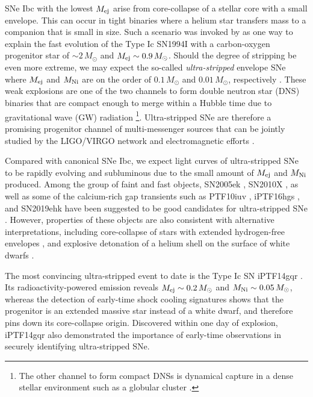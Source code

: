 \documentclass[twocolumn]{aastex63}
\begin{document}
SNe Ibc with the lowest $M_{\rm ej}$ arise from core-collapse of a stellar core with a small envelope. 
This can occur in tight binaries where a helium star transfers 
mass to a companion that is small in size. Such a scenario was invoked by \citet{Nomoto1994} as one
way to explain the fast evolution of the Type Ic SN1994I with a carbon-oxygen progenitor star of $\sim 
2\,M_\odot$ and $M_{\rm ej }\sim 0.9\, M_\odot$. Should the degree of stripping be even more extreme, 
we may expect the so-called \textit{ultra-stripped} envelope SNe where $M_{\rm ej}$ and $M_{\rm Ni} $ 
are on the order of $0.1 \, M_\odot$ and $0.01 \, M_\odot$, respectively \citep{Tauris2013,Tauris2015, 
Suwa2015}. These weak explosions are one of the two channels to form double neutron 
star (DNS) binaries that are compact enough to merge within a Hubble 
time due to gravitational wave (GW) radiation \citep{Beniamini2016, Tauris2017}\footnote{The other 
channel to 	form compact DNSs is dynamical capture in a dense stellar environment such as a globular 
cluster \citep{East2012, Andrews2019}.}. Ultra-stripped SNe are therefore 
a promising progenitor channel of multi-messenger sources that can be  jointly studied 
by the LIGO/VIRGO network and electromagnetic efforts \citep{GW170817, MMA, Goldstein2017, 
Coulter17, Hallinan17, Kasliwal2017}.

Compared with canonical SNe Ibc, we expect light curves of ultra-stripped SNe to be rapidly evolving 
and subluminous due to the small amount of $M_{\rm ej}$ and $M_{\rm Ni}$ produced. Among the 
group of faint and fast objects, SN2005ek \citep{Drout2013}, SN2010X \citep{Kasliwal2010}, as well as 
some of the calcium-rich gap transients such as PTF10iuv \citep{Kasliwal2012}, iPTF16hgs 
\citep{DeKC2018}, and SN2019ehk \citep{Nakaoka2020, Jacobson-Galan2020} have been suggested to 
be good candidates 
for ultra-stripped SNe \citep{Moriya2017}. However, properties of these objects are also consistent 
with alternative interpretations, including core-collapse of stars with extended hydrogen-free envelopes
\citep{Kleiser2014, KleiserFuller2018, KleiserKasen2018}, and explosive detonation of a helium shell on 
the surface of white dwarfs \citep{Shen2010, Sim2012, Polin2019, JacobsonGalan2019, De2020b}.

The most convincing ultra-stripped event to date is the Type Ic SN iPTF14gqr \citep{De2018}. Its 
radioactivity-powered emission reveals $M_{\rm ej}\sim 0.2\, M_\odot$ and $M_{\rm Ni}\sim 
0.05\,M_\odot$, whereas the detection of early-time shock cooling signatures shows that the 
progenitor is an extended massive star instead of a white dwarf, and therefore pins down its 
core-collapse origin. Discovered within one day of explosion, iPTF14gqr also demonstrated the 
importance of early-time observations in securely identifying ultra-stripped SNe. 
\end{document}
